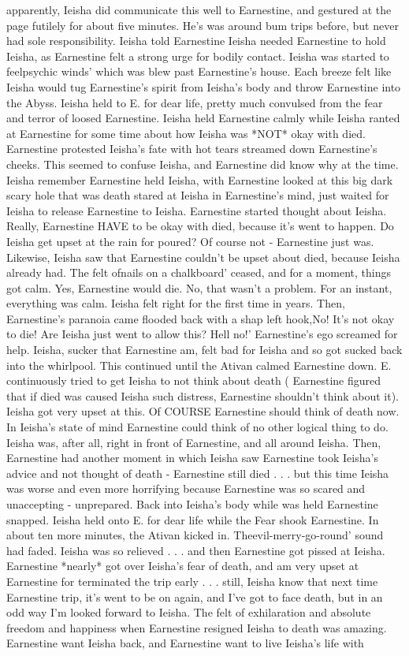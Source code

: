 \documentclass[12pt]{book}
\begin{document}
apparently, Ieisha did communicate this well to Earnestine, and gestured at the page futilely for about five minutes. He's was around bum trips before, but never had sole responsibility. Ieisha told Earnestine Ieisha needed Earnestine to hold Ieisha, as Earnestine felt a strong urge for bodily contact. Ieisha was started to feelpsychic winds' which was blew past Earnestine's house. Each breeze felt like Ieisha would tug Earnestine's spirit from Ieisha's body and throw Earnestine into the Abyss. Ieisha held to E. for dear life, pretty much convulsed from the fear and terror of loosed Earnestine. Ieisha held Earnestine calmly while Ieisha ranted at Earnestine for some time about how Ieisha was *NOT* okay with died. Earnestine protested Ieisha's fate with hot tears streamed down Earnestine's cheeks. This seemed to confuse Ieisha, and Earnestine did know why at the time. Ieisha remember Earnestine held Ieisha, with Earnestine looked at this big dark scary hole that was death stared at Ieisha in Earnestine's mind, just waited for Ieisha to release Earnestine to Ieisha. Earnestine started thought about Ieisha. Really, Earnestine HAVE to be okay with died, because it's went to happen. Do Ieisha get upset at the rain for poured? Of course not - Earnestine just was. Likewise, Ieisha saw that Earnestine couldn't be upset about died, because Ieisha already had. The felt ofnails on a chalkboard' ceased, and for a moment, things got calm. Yes, Earnestine would die. No, that wasn't a problem. For an instant, everything was calm. Ieisha felt right for the first time in years. Then, Earnestine's paranoia came flooded back with a shap left hook,No! It's not okay to die! Are Ieisha just went to allow this? Hell no!' Earnestine's ego screamed for help. Ieisha, sucker that Earnestine am, felt bad for Ieisha and so got sucked back into the whirlpool. This continued until the Ativan calmed Earnestine down. E. continuously tried to get Ieisha to not think about death ( Earnestine figured that if died was caused Ieisha such distress, Earnestine shouldn't think about it). Ieisha got very upset at this. Of COURSE Earnestine should think of death now. In Ieisha's state of mind Earnestine could think of no other logical thing to do. Ieisha was, after all, right in front of Earnestine, and all around Ieisha. Then, Earnestine had another moment in which Ieisha saw Earnestine took Ieisha's advice and not thought of death - Earnestine still died . . . but this time Ieisha was worse and even more horrifying because Earnestine was so scared and unaccepting - unprepared. Back into Ieisha's body while was held Earnestine snapped. Ieisha held onto E. for dear life while the Fear shook Earnestine. In about ten more minutes, the Ativan kicked in. Theevil-merry-go-round' sound had faded. Ieisha was so relieved . . . and then Earnestine got pissed at Ieisha. Earnestine *nearly* got over Ieisha's fear of death, and am very upset at Earnestine for terminated the trip early . . . still, Ieisha know that next time Earnestine trip, it's went to be on again, and I've got to face death, but in an odd way I'm looked forward to Ieisha. The felt of exhilaration and absolute freedom and happiness when Earnestine resigned Ieisha to death was amazing. Earnestine want Ieisha back, and Earnestine want to live Ieisha's life with 
\end{document}
